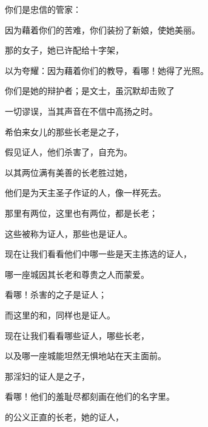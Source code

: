 你们是忠信的管家：\par

因为藉着你们的苦难，你们装扮了新娘，使她美丽。\par

那的女子，她已许配给十字架，\par

以为夸耀：因为藉着你们的教导，看哪！她得了光照。\par

你们是她的辩护者；是文士，虽沉默却击败了\par

一切谬误，当其声音在不信中高扬之时。\par

希伯来女儿的那些长老是之子，\par

假见证人，他们杀害了，自充为。\par

以其两位满有美善的长老胜过她，\par

他们是为天主圣子作证的人，像一样死去。\par

那里有两位，这里也有两位，都是长老；\par

这些被称为证人，那些也是证人。\par

现在让我们看看他们中哪一些是天主拣选的证人，\par

哪一座城因其长老和尊贵之人而蒙爱。\par

看哪！杀害的之子是证人；\par

而这里的和，同样也是证人。\par

现在让我们看看哪些证人，哪些长老，\par

以及哪一座城能坦然无惧地站在天主面前。\par

那淫妇的证人是之子，\par

看哪！他们的羞耻尽都刻画在他们的名字里。\par

的公义正直的长老，她的证人，\par

